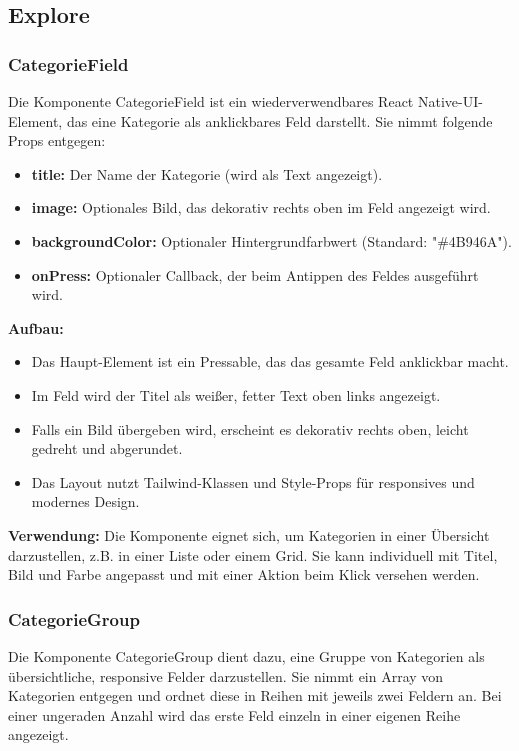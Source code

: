 \documentclass[12pt, a4paper]{report} %
\begin{document}
\subsection{Explore}

\subsubsection{CategorieField}
Die Komponente CategorieField ist ein wiederverwendbares React Native-UI-Element, das eine Kategorie als anklickbares Feld darstellt. Sie nimmt folgende Props entgegen:
\begin{itemize}
    \item \textbf{title:} Der Name der Kategorie (wird als Text angezeigt).
    \item \textbf{image:} Optionales Bild, das dekorativ rechts oben im Feld angezeigt wird.
    \item \textbf{backgroundColor:} Optionaler Hintergrundfarbwert (Standard: "\#4B946A").
    \item \textbf{onPress:} Optionaler Callback, der beim Antippen des Feldes ausgeführt wird.
\end{itemize}

\noindent\textbf{Aufbau:}
\begin{itemize}
    \item Das Haupt-Element ist ein Pressable, das das gesamte Feld anklickbar macht.
    \item Im Feld wird der Titel als weißer, fetter Text oben links angezeigt.
    \item Falls ein Bild übergeben wird, erscheint es dekorativ rechts oben, leicht gedreht und abgerundet.
    \item Das Layout nutzt Tailwind-Klassen und Style-Props für responsives und modernes Design.
\end{itemize}

\noindent\textbf{Verwendung:} Die Komponente eignet sich, um Kategorien in einer Übersicht darzustellen, z.B. in einer Liste oder einem Grid. Sie kann individuell mit Titel, Bild und Farbe angepasst und mit einer Aktion beim Klick versehen werden.

\subsubsection{CategorieGroup}
Die Komponente CategorieGroup dient dazu, eine Gruppe von Kategorien als übersichtliche, responsive Felder darzustellen. Sie nimmt ein Array von Kategorien entgegen und ordnet diese in Reihen mit jeweils zwei Feldern an. Bei einer ungeraden Anzahl wird das erste Feld einzeln in einer eigenen Reihe angezeigt.
\end{document}

